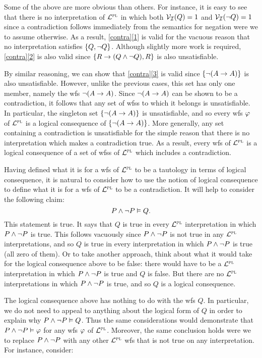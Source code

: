 Some of the above are more obvious than others.
For instance, it is easy to see that there is no interpretation of $\mathcal{L}^{\textsc{pl}}$ in which both $\mathcal{V}_{\mathcal{I}}(Q) = 1$ and $\mathcal{V}_{\mathcal{I}}(\neg Q) = 1$ since a contradiction follows immediately from the semantics for negation were we to assume otherwise.
As a result, \ref{contra}\ref{1} is valid for the vacuous reason that no interpretation satisfies $\lbrace Q, \neg Q\rbrace$.
Although slightly more work is required, \ref{contra}\ref{2} is also valid since $\lbrace R \rightarrow (Q \wedge \neg Q), R\rbrace$ is also unsatisfiable.

By similar reasoning, we can show that \ref{contra}\ref{3} is valid since $\lbrace\neg (A \rightarrow A)\rbrace$ is also unsatisfiable. 
However, unlike the previous cases, this set has only one member, namely the wfs $\neg (A \rightarrow A)$.
Since $\neg (A \rightarrow A)$ can be shown to be a contradiction, it follows that any set of wfss to which it belongs is unsatisfiable.
In particular, the singleton set $\lbrace\neg (A \rightarrow A)\rbrace$ is unsatisfiable, and so every wfs $\varphi$ of $\mathcal{L}^{\textsc{pl}}$ is a logical consequence of $\lbrace\neg (A \rightarrow A)\rbrace$. 
More generally, any set containing a contradiction is unsatisfiable for the simple reason that there is no interpretation which makes a contradiction true.
As a result, every wfs of $\mathcal{L}^{\textsc{pl}}$ is a logical consequence of a set of wfss of $\mathcal{L}^{\textsc{pl}}$ which includes a contradiction. 


Having defined what it is for a wfs of $\mathcal{L}^{\textsc{pl}}$ to be a tautology in terms of logical consequence, it is natural to consider how to use the notion of logical consequence to define what it is for a wfs of $\mathcal{L}^{\textsc{pl}}$ to be a contradiction.
It will help to consider the following claim:
  $$P \wedge \neg P \vDash Q.$$
This statement is true.
It says that $Q$ is true in every $\mathcal{L}^{\textsc{pl}}$ interpretation in which $P \wedge \neg P$ is true.
This follows vacuously since $P \wedge \neg P$ is not true in any $\mathcal{L}^{\textsc{pl}}$ interpretations, and so $Q$ is true in every interpretation in which $P \wedge \neg P$ is true (all zero of them).
Or to take another approach, think about what it would take for the logical consequence above to be false: there would have to be a $\mathcal{L}^{\textsc{pl}}$ interpretation in which $P \wedge \neg P$ is true and $Q$ is false.
But there are no $\mathcal{L}^{\textsc{pl}}$ interpretations in which $P \wedge \neg P$ is true, and so $Q$ is a logical consequence.

The logical consequence above has nothing to do with the wfs $Q$.
In particular, we do not need to appeal to anything about the logical form of $Q$ in order to explain why $P \wedge \neg P \vDash Q$. 
Thus the same considerations would demonstrate that $P \wedge \neg P \vDash \varphi$ for any wfs $\varphi$ of $\mathcal{L}^{\textsc{pl}}$.
Moreover, the same conclusion holds were we to replace $P \wedge \neg P$ with any other $\mathcal{L}^{\textsc{pl}}$ wfs that is not true on any interpretation.
For instance, consider:

